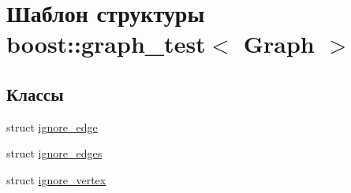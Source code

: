 \hypertarget{structboost_1_1graph__test}{}\section{Шаблон структуры boost\+:\+:graph\+\_\+test$<$ Graph $>$}
\label{structboost_1_1graph__test}
\subsection*{Классы}
\begin{DoxyCompactItemize}
\item 
struct \hyperlink{structboost_1_1graph__test_1_1ignore__edge}{ignore\+\_\+edge}
\item 
struct \hyperlink{structboost_1_1graph__test_1_1ignore__edges}{ignore\+\_\+edges}
\item 
struct \hyperlink{structboost_1_1graph__test_1_1ignore__vertex}{ignore\+\_\+vertex}
\end{DoxyCompactItemize}
